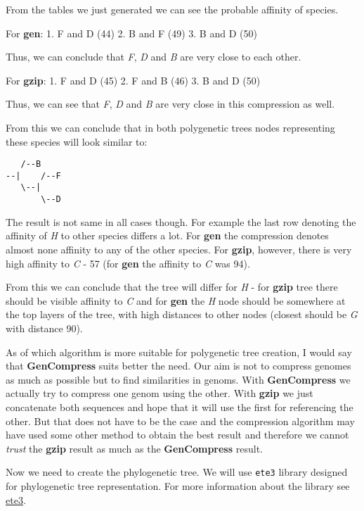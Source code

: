 \documentclass[11pt]{article}
\begin{document}
    From the tables we just generated we can see the probable affinity of
species.

For \textbf{gen}: 1. F and D (44) 2. B and F (49) 3. B and D (50)

Thus, we can conclude that \emph{F}, \emph{D} and \emph{B} are very
close to each other.

For \textbf{gzip}: 1. F and D (45) 2. F and B (46) 3. B and D (50)

Thus, we can see that \emph{F}, \emph{D} and \emph{B} are very close in
this compression as well.

From this we can conclude that in both polygenetic trees nodes
representing these species will look similar to:

\begin{verbatim}
   /--B
--|    /--F
   \--|
       \--D
\end{verbatim}

The result is not same in all cases though. For example the last row
denoting the affinity of \emph{H} to other species differs a lot. For
\textbf{gen} the compression denotes almost none affinity to any of the
other species. For \textbf{gzip}, however, there is very high affinity
to \emph{C} - 57 (for \textbf{gen} the affinity to \emph{C} was 94).

From this we can conclude that the tree will differ for \emph{H} - for
\textbf{gzip} tree there should be visible affinity to \emph{C} and for
\textbf{gen} the \emph{H} node should be somewhere at the top layers of
the tree, with high distances to other nodes (closest should be \emph{G}
with distance 90).

As of which algorithm is more suitable for polygenetic tree creation, I
would say that \textbf{GenCompress} suits better the need. Our aim is
not to compress genomes as much as possible but to find similarities in
genoms. With \textbf{GenCompress} we actually try to compress one genom
using the other. With \textbf{gzip} we just concatenate both sequences
and hope that it will use the first for referencing the other. But that
does not have to be the case and the compression algorithm may have used
some other method to obtain the best result and therefore we cannot
\emph{trust} the \textbf{gzip} result as much as the
\textbf{GenCompress} result.

    Now we need to create the phylogenetic tree. We will use \texttt{ete3}
library designed for phylogenetic tree representation. For more
information about the library see
\href{http://etetoolkit.org/ipython_notebook/}{ete3}.
\end{document}
